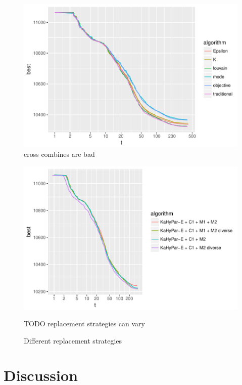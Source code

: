 \documentclass[a4paper,12pt,bibtotoc,titlepage, liststotoc,BCOR7mm,headsepline,pointlessnumbers]{scrbook}
\numberwithin{equation}{section}
\begin{document}
\begin{figure}
\caption{cross combines are bad}
\begin{center}
\includegraphics{bachelorarbeit-badcrosscombines}
\end{center}
\end{figure}


\begin{figure}
\caption{Different replacement strategies}
\begin{center}
\includegraphics{bachelorarbeit-insertrandom}
\end{center}
TODO replacement strategies can vary 

\end{figure}


\chapter{Discussion}
\end{document}
